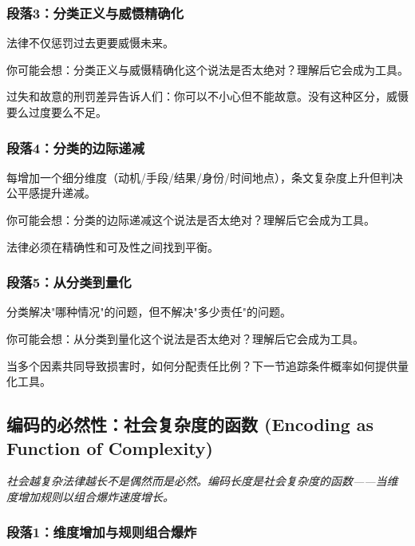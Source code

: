 \documentclass[a4paper,12pt]{book}
\newenvironment{motivation}{\begin{tcolorbox}[colback=gray!10,colframe=gray!60,title=\textit{动机}]\small\itshape}{\end{tcolorbox}}
\begin{document}
\begin{motivation}
\begin{motivation}
\begin{motivation}
	\subsubsection*{段落3：分类正义与威慑精确化}
	法律不仅惩罚过去更要威慑未来。
	\begin{tcolorbox}[colback=yellow!5, title=\textit{读者行为预测}]
		你可能会想：分类正义与威慑精确化这个说法是否太绝对？理解后它会成为工具。
	\end{tcolorbox}

过失和故意的刑罚差异告诉人们：你可以不小心但不能故意。没有这种区分，威慑要么过度要么不足。

	\subsubsection*{段落4：分类的边际递减}
	每增加一个细分维度（动机/手段/结果/身份/时间地点），条文复杂度上升但判决公平感提升递减。
	\begin{tcolorbox}[colback=yellow!5, title=\textit{读者行为预测}]
		你可能会想：分类的边际递减这个说法是否太绝对？理解后它会成为工具。
	\end{tcolorbox}

法律必须在精确性和可及性之间找到平衡。

	\subsubsection*{段落5：从分类到量化}
	分类解决"哪种情况"的问题，但不解决"多少责任"的问题。
	\begin{tcolorbox}[colback=yellow!5, title=\textit{读者行为预测}]
		你可能会想：从分类到量化这个说法是否太绝对？理解后它会成为工具。
	\end{tcolorbox}

当多个因素共同导致损害时，如何分配责任比例？下一节追踪条件概率如何提供量化工具。

	\subsection{编码的必然性：社会复杂度的函数 (Encoding as Function of Complexity)}
	\begin{motivation}
		社会越复杂法律越长不是偶然而是必然。编码长度是社会复杂度的函数——当维度增加规则以组合爆炸速度增长。
	\end{motivation}
	\subsubsection*{段落1：维度增加与规则组合爆炸}


\end{motivation}
\end{motivation}
\end{motivation}
\end{document}
